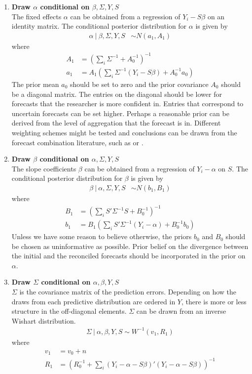 \documentclass[a4paper,fleqn,11pt]{article}
\begin{document}
\begin{enumerate}
\item \textbf{Draw $\alpha$ conditional on $\beta,\Sigma,Y,S$}\\
The fixed effects $\alpha$ can be obtained from a regression of $Y_i - S\beta$ on an identity matrix. The conditional posterior distribution for $\alpha$ is given by
\begin{align}
	\label{eq:alpha}
\alpha\ |\ \beta,\Sigma,Y,S &\sim N(a_1,A_1)
\end{align}
where
\begin{align*}
A_1 &= \left(\sum_i \Sigma^{-1} + A_0^{-1}\right)^{-1} \\
a_1 &= A_1 \left(\sum_i \Sigma^{-1} (Y_i - S\beta) + A_0^{-1}a_0\right)
\end{align*}
The prior mean $a_0$ should be set to zero and the prior covariance $A_0$ should be a diagonal matrix. The entries on the diagonal should be lower for forecasts that the researcher is more confident in. Entries that correspond to uncertain forecasts can be set higher. Perhaps a reasonable prior can be derived from the level of aggregation that the forecast is in. Different weighting schemes might be tested and conclusions can be drawn from the forecast combination literature, such as \cite{Cesur2016} or \cite{Brooks2001}.\\

\item \textbf{Draw $\beta$ conditional on $\alpha,\Sigma,Y,S$}\\
The slope coefficients $\beta$ can be obtained from a regression of $Y_i - \alpha$ on $S$. The conditional posterior distribution for $\beta$ is given by
\begin{align}
\beta\ |\ \alpha,\Sigma,Y,S &\sim N(b_1,B_1)
\end{align}
where
\begin{align*}
B_1 &= \left(\sum_i S'\Sigma^{-1}S + B_0^{-1}\right)^{-1} \\
b_1 &= B_1 \left(\sum_i S'\Sigma^{-1} (Y_i - \alpha) + B_0^{-1}b_0\right)
\end{align*}
Unless we have some reason to believe otherwise, the priors $b_0$ and $B_0$ should be chosen as uninformative as possible. Prior belief on the divergence between the initial and the reconciled forecasts should be incorporated in the prior on $\alpha$. \\

\item \textbf{Draw $\Sigma$ conditional on $\alpha,\beta,Y,S$}\\
$\Sigma$ is the covariance matrix of the prediction errors. Depending on how the draws from each predictive distribution are ordered in $Y$, there is more or less structure in the off-diagonal elements. $\Sigma$ can be drawn from an inverse Wishart distribution.
\begin{align}
\Sigma\ |\ \alpha,\beta,Y,S \sim W^{-1}(v_1,R_1)
\end{align}
where
\begin{align*}
v_1 &= v_0 + n\\
R_1 &=  \left( R_0^{-1} + \sum_i (Y_i - \alpha - S \beta)'(Y_i - \alpha - S \beta) \right)^{-1}
\end{align*}


\end{enumerate}
\end{document}
